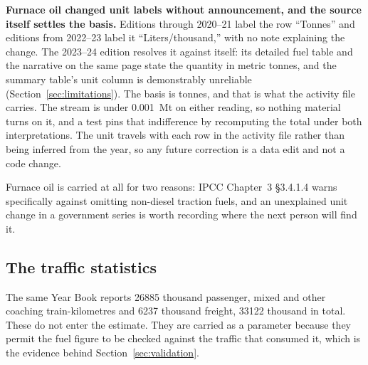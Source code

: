 \textbf{Furnace oil changed unit labels without announcement, and the source itself settles
the basis.} Editions through 2020--21 label the row ``Tonnes'' and editions from 2022--23 label
it ``Liters/thousand,'' with no note explaining the change. The 2023--24 edition resolves it
against itself: its detailed fuel table and the narrative on the same page state the quantity
in metric tonnes, and the summary table's unit column is demonstrably unreliable
(Section~\ref{sec:limitations}). The basis is tonnes, and that is what the activity file
carries. The stream is under \SI{0.001}{\mega\tonne} \COe{} on either reading, so nothing
material turns on it, and a test pins that indifference by recomputing the total under both
interpretations. The unit travels with each row in the activity file rather than being
inferred from the year, so any future correction is a data edit and not a code change.

Furnace oil is carried at all for two reasons: IPCC Chapter~3 §3.4.1.4 warns specifically
against omitting non-diesel traction fuels, and an unexplained unit change in a government
series is worth recording where the next person will find it.

\subsection{The traffic statistics}

The same Year Book reports \num{26885} thousand passenger, mixed and other coaching
train-kilometres and \num{6237} thousand freight, \num{33122} thousand in total. These do not
enter the estimate. They are carried as a parameter because they permit the fuel figure to be
checked against the traffic that consumed it, which is the evidence behind
Section~\ref{sec:validation}.
